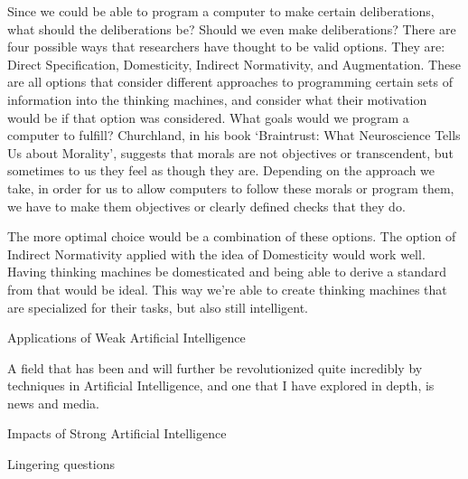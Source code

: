 \documentclass[11pt]{article}
\begin{document}
\par Since we could be able to program a computer to make certain deliberations, what should the deliberations be? Should we even make deliberations? There are four possible ways that researchers have thought to be valid options. They are: Direct Specification, Domesticity, Indirect Normativity, and Augmentation. These are all options that consider different approaches to programming certain sets of information into the thinking machines, and consider what their motivation would be if that option was considered. What goals would we program a computer to fulfill? Churchland, in his book `Braintrust: What Neuroscience Tells Us about Morality', suggests that morals are not objectives or transcendent, but sometimes to us they feel as though they are. Depending on the approach we take, in order for us to allow computers to follow these morals or program them, we have to make them objectives or clearly defined checks that they do.

\par The more optimal choice would be a combination of these options. The option of Indirect Normativity applied with the idea of Domesticity would work well. Having thinking machines be domesticated and being able to derive a standard from that would be ideal. This way we're able to create thinking machines that are specialized for their tasks, but also still intelligent.

\begin{center}
	{\large Applications of Weak Artificial Intelligence\par}
\end{center}

\par A field that has been and will further be revolutionized quite incredibly by techniques in Artificial Intelligence, and one that I have explored in depth, is news and media.

\begin{center}
	{\large Impacts of Strong Artificial Intelligence\par}
\end{center}

\par 

\begin{center}
	{\large Lingering questions\par}
\end{center}
\end{document}
